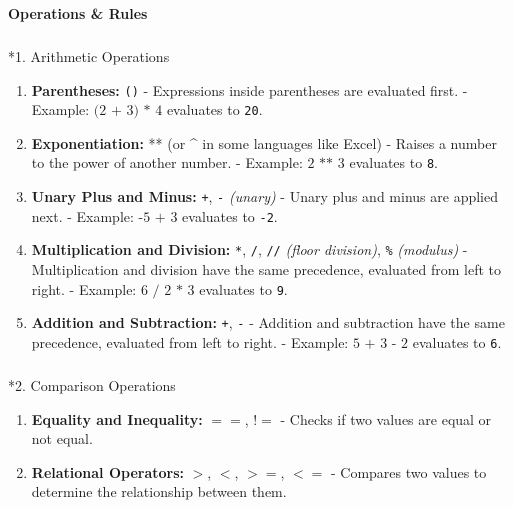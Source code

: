 \documentclass[
  letterpaper,
  DIV=11,
  numbers=noendperiod]{scrreprt}
\makeatletter
\let\oldsubparagraph\subparagraph
\renewcommand{\subparagraph}{
    \@ifstar
      \xxxSubParagraphStar
      \xxxSubParagraphNoStar
  }
\newcommand{\xxxSubParagraphStar}[1]{\oldsubparagraph*{#1}\mbox{}}
\newcommand{\xxxSubParagraphNoStar}[1]{\oldsubparagraph{#1}\mbox{}}
\makeatother
\begin{document}
\begin{tcolorbox}[enhanced jigsaw, colframe=quarto-callout-note-color-frame, toprule=.15mm, bottomrule=.15mm, rightrule=.15mm, colback=white, breakable, arc=.35mm, opacityback=0, left=2mm, leftrule=.75mm]

\vspace{-3mm}\textbf{Operations \& Rules}\vspace{3mm}

\subparagraph*{1. Arithmetic Operations}\label{arithmetic-operations}

\begin{enumerate}
\def\labelenumi{\arabic{enumi}.}
\item
  \textbf{Parentheses:} \texttt{()} - Expressions inside parentheses are
  evaluated first. - Example: \(\text{(2 + 3) * 4}\) evaluates to
  \texttt{20}.
\item
  \textbf{Exponentiation:} ** (or \^{} in some languages like Excel) -
  Raises a number to the power of another number. - Example:
  \(\text{2 ** 3}\) evaluates to \texttt{8}.
\item
  \textbf{Unary Plus and Minus:} \texttt{+}, \texttt{-} \emph{(unary)} -
  Unary plus and minus are applied next. - Example: \(\text{-5 + 3}\)
  evaluates to \texttt{-2}.
\item
  \textbf{Multiplication and Division:} \texttt{*}, \texttt{/},
  \texttt{//} \emph{(floor division)}, \texttt{\%} \emph{(modulus)} -
  Multiplication and division have the same precedence, evaluated from
  left to right. - Example: \(\text{6 / 2 * 3}\) evaluates to
  \texttt{9}.
\item
  \textbf{Addition and Subtraction:} \texttt{+}, \texttt{-} - Addition
  and subtraction have the same precedence, evaluated from left to
  right. - Example: \(\text{5 + 3 - 2}\) evaluates to \texttt{6}.
\end{enumerate}

\subparagraph*{2. Comparison Operations}\label{comparison-operations}

\begin{enumerate}
\def\labelenumi{\arabic{enumi}.}
\item
  \textbf{Equality and Inequality:} \(==\), \(!=\) - Checks if two
  values are equal or not equal.
\item
  \textbf{Relational Operators:} \(>\), \(<\), \(>=\), \(<=\) - Compares
  two values to determine the relationship between them.
\end{enumerate}


\end{tcolorbox}
\end{document}
